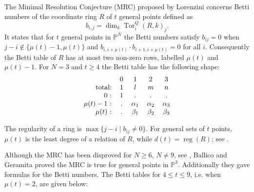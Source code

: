 \documentclass[reqno]{amsart}
\DeclareMathOperator{\Tor}{Tor}
\DeclareMathOperator{\reg}{reg}
\renewcommand{\P}{\mathbb{P}}
\theoremstyle{plain} %
\theoremstyle{definition}
\theoremstyle{remark}
\begin{document}
The Minimal Resolution Conjecture (MRC) proposed by Lorenzini \cite{Lorenzini1, Lorenzini} 
concerns Betti numbers of the coordinate ring $R$ of $t$ general points defined as $$b_{i,j}=\dim_k \Tor_i^Q(R,k)_j.$$ It states that for $t$ general points in $\P^N$ 
the Betti numbers satisfy $b_{ij}=0$ when $j-i\notin \{ \mu(t)-1,\mu(t)\}$  and $b_{i,i+\mu(t)}\cdot b_{i+1,i+\mu(t)}=0$ for all $i$. Consequently the Betti table of $R$ has  at most two non-zero rows, labelled $\mu(t)$ and $\mu(t)-1$.  For $N=3$ and $t\geq 4$ the Betti table has the following shape:
\begin{equation}\label{Betti_codim3}
\begin{tabular}{r c c c c c}
 & 0 & 1 & 2 & 3 \\

total: & 1 & ${l}$ & $m$ & $n$ \\
0 : & 1 & . & . & . \\
$\mu(t)-1$ : & . & $\alpha_1$ & $\alpha_2$ & $\alpha_3$ \\
$\mu(t)$ : & . & $\beta_1$ & $\beta_2$ & $\beta_3$ 
\end{tabular}
\end{equation}

The regularity of a ring is $\max\{j-i\mid b_{ij}\neq 0\}$. 
For general sets of $t$ points,  $\mu(t)$ is the least degree of a relation of $R$, while $d(t)=\reg(R)$; see \cite[Corollary 4.7]{EisenbudSyzygy}. 

Although the MRC has been disproved for $N\geq 6$, $N\neq 9$, see \cite{MRC-counter}, Ballico and Geramita \cite{BGgenPts} proved the MRC is true for general points in $\P^3$. Additionally they gave formulas for the Betti numbers. The Betti tables for $4\leq t\leq 9$, i.e. when $\mu(t)=2$, are given below:
\end{document}
